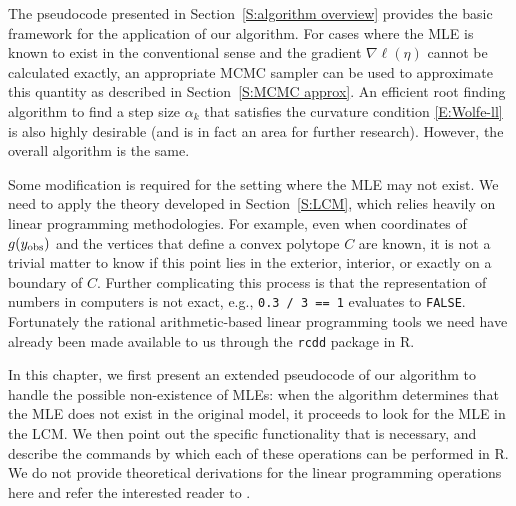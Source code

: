 The pseudocode presented in Section~\ref{S:algorithm overview} provides the 
basic framework for the application of our algorithm.
For cases where the MLE is known to exist in the conventional sense
and  the gradient $\nabla \ell(\eta)$  
cannot be calculated exactly, an appropriate MCMC sampler can be used to 
approximate this quantity as described in Section~\ref{S:MCMC approx}.  
An efficient root finding algorithm to find a step size $\alpha_k$ that satisfies the 
curvature condition \eqref{E:Wolfe-ll} is also highly desirable (and is in fact
an area for further research).  However, the overall algorithm
is the same.

Some modification is required for the setting where the MLE may not exist.  
We need to apply the theory developed in Section~\ref{S:LCM}, which
relies heavily on linear programming methodologies.  For example, even when coordinates 
of $g(y_{\text{obs}})$ and the vertices that define a convex polytope $C$ are known, it 
is not a trivial matter to know if this point lies in the exterior, interior, 
or exactly on a boundary of $C$.  
Further complicating this process is that the representation of 
numbers in computers is not exact, e.g., \texttt{0.3 / 3 == 1} evaluates
to \texttt{FALSE}.  Fortunately the rational arithmetic-based linear programming
tools we need have already 
been made available to us through the \texttt{rcdd} package \citep{rcdd:R} in R.  

In this chapter, we first present an extended pseudocode of our algorithm 
to handle the possible non-existence of MLEs: when the algorithm determines that 
the MLE does not exist in the original model, it proceeds to 
look for the MLE in the LCM.  
We then point out the specific functionality that is necessary,
and describe the commands by which each of these operations can be performed in R.
We do not provide theoretical derivations for the linear programming operations here
and refer the interested reader to \citep{Fukuda:2004,Fukuda:2008}.

